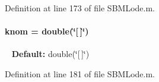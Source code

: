 Definition at line 173 of file S\+B\+M\+Lode.\+m.

\hypertarget{class_s_b_m_lode_a744d356a79732f2b65d02f220c580dd4}{}
\paragraph[{knom}]{\setlength{\rightskip}{0pt plus 5cm}knom = double(\char`\"{}\mbox{[}$\,$\mbox{]}\char`\"{})}\label{class_s_b_m_lode_a744d356a79732f2b65d02f220c580dd4}
~\newline
{\bfseries Default\+:} double(\char`\"{}\mbox{[}$\,$\mbox{]}\char`\"{}) 

Definition at line 181 of file S\+B\+M\+Lode.\+m.

